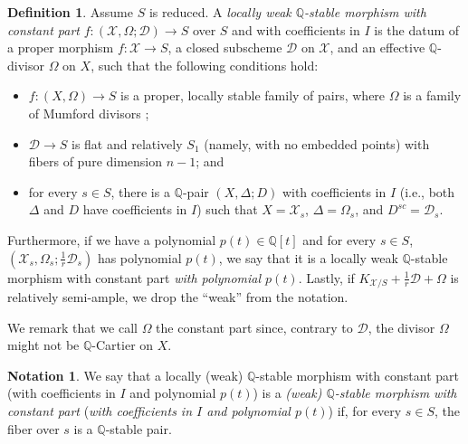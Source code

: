 \documentclass{amsart}
\newcommand{\bQ}{\mathbb{Q}}
\newcommand{\cD}{\mathcal{D}}
\newcommand{\cX}{\mathcal{X}}
\theoremstyle{definition}
\newtheorem{Def}[theorem]{Definition}
\newtheorem{Notation}[theorem]{Notation}
\newcommand{\rar}{\rightarrow}
\def\K#1.{K_{#1}}
\renewcommand{\qq}{\mathbb{Q}}
\begin{document}
\begin{Def}
Assume $S$ is reduced.
A \emph{locally weak $\bQ$-stable morphism with constant part} $f \colon (\cX,\Omega;\cD) \rar S$ over $S$ and with coefficients in $I$ is the datum of a proper morphism $f \colon \cX \rar S$, a closed subscheme $\cD$ on $\cX$, and an effective $\qq$-divisor $\Omega$ on $X$, such that the following conditions hold:
\begin{itemize}
    \item $f \colon (X,\Omega) \rar S$ is a proper, locally stable family of pairs, where $\Omega$ is a family of Mumford divisors \cite{kol19s};
    \item $\cD \rar S$ is flat and relatively $S_1$ (namely, with no embedded points) with fibers of pure dimension $n-1$; and
    \item for every $s \in S$, there is a $\bQ$-pair $(X,\Delta;D)$  with coefficients in $I$ (i.e., both $\Delta$ and $D$ have coefficients in $I$) such that $X=\cX_s$, $\Delta=\Omega_s$, and $D^{sc}=\cD_s$.
\end{itemize}
Furthermore, if we have a polynomial $p(t) \in \qq[t]$ and for every $s \in S$, $(\cX_s,\Omega_s;\frac{1}{r}\cD_s)$ has polynomial $p(t)$, we say that it is a
locally weak $\bQ$-stable morphism with constant part {\it with polynomial $p(t)$}.
Lastly, if $\K \mathcal{X}/S. + \frac{1}{r}\mathcal{D}+\Omega$ is relatively semi-ample, we drop the ``weak'' from the notation.
\end{Def}
We remark that we call $\Omega$ the constant part since, contrary to $\cD$, the divisor $\Omega$ might not be $\bQ$-Cartier on $X$.

\begin{Notation}
We say that a locally (weak) $\bQ$-stable morphism with constant part (with coefficients in $I$ and polynomial $p(t)$) is a \emph{(weak) $\bQ$-stable morphism with constant part} (\emph{with coefficients in $I$ and polynomial $p(t)$}) if, for every $s \in S$, the fiber over $s$ is a $\bQ$-stable pair.
\end{Notation}
\end{document}
